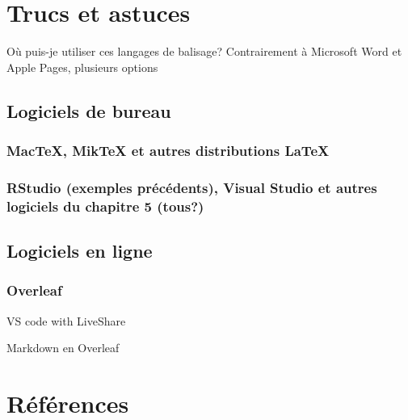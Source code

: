 \documentclass[
  letterpaper,
  DIV=11,
  numbers=noendperiod]{scrreprt}
\begin{document}
\hypertarget{trucs-et-astuces-1}{%
\section{Trucs et astuces}\label{trucs-et-astuces-1}}

Où puis-je utiliser ces langages de balisage? Contrairement à Microsoft
Word et Apple Pages, plusieurs options

\hypertarget{logiciels-de-bureau}{%
\subsection{Logiciels de bureau}\label{logiciels-de-bureau}}

\hypertarget{mactex-miktex-et-autres-distributions}{%
\subsubsection{\texorpdfstring{MacTeX, MikTeX et autres distributions
\LaTeX}{MacTeX, MikTeX et autres distributions }}\label{mactex-miktex-et-autres-distributions}}

\hypertarget{rstudio-exemples-pruxe9cuxe9dents-visual-studio-et-autres-logiciels-du-chapitre-5-tous}{%
\subsubsection{RStudio (exemples précédents), Visual Studio et autres
logiciels du chapitre 5
(tous?)}\label{rstudio-exemples-pruxe9cuxe9dents-visual-studio-et-autres-logiciels-du-chapitre-5-tous}}

\hypertarget{logiciels-en-ligne}{%
\subsection{Logiciels en ligne}\label{logiciels-en-ligne}}

\hypertarget{overleaf}{%
\subsubsection{Overleaf}\label{overleaf}}

VS code with LiveShare

Markdown en Overleaf

\hypertarget{ruxe9fuxe9rences}{%
\section{Références}\label{ruxe9fuxe9rences}}
\end{document}
